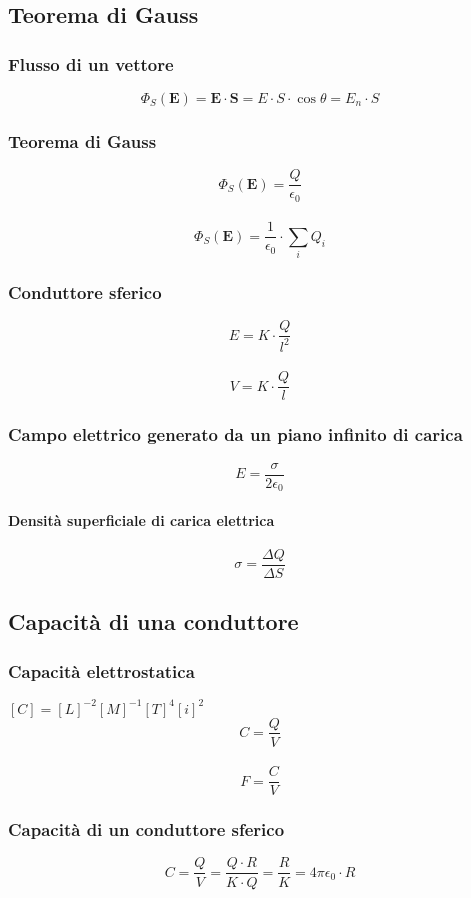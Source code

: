 \documentclass[a4paper,12pt]{article}
\theoremstyle{mystyle}
\begin{document}
\newpage


\subsection{Teorema di Gauss}
\subsubsection{Flusso di un vettore}
\[\Phi_S (\textbf{E}) = \textbf{E} \cdot \textbf{S} = E \cdot S \cdot \cos \theta = E_n \cdot S\]
\subsubsection{Teorema di Gauss}
\[\Phi_S (\textbf{E}) = \frac{Q}{\epsilon _0}\]\\
\[\Phi _S (\textbf{E}) = \frac{1}{\epsilon_0} \cdot \sum_i Q_i\]
\subsubsection{Conduttore sferico}
\[E = K \cdot \frac{Q}{l^2}\]\\
\[V = K \cdot \frac{Q}{l}\]
\subsubsection{Campo elettrico generato da un piano infinito di carica}
\[E = \frac{\sigma}{2 \epsilon_0}\]
\paragraph{Densità superficiale di carica elettrica}
\[\sigma = \frac{\Delta Q}{\Delta S}\]

\newpage

 
\subsection{Capacità di una conduttore}
\subsubsection{Capacità elettrostatica}
\([C]=[L]^{-2}[M]^{-1}[T]^4[i]^2\)\\
\[C = \frac{Q}{V}\]\\
\[F= \frac{C}{V}\]
\subsubsection{Capacità di un conduttore sferico}
\[C = \frac{Q}{V} = \frac{Q \cdot R}{K \cdot Q} = \frac{R}{K} = 4 \pi \epsilon_0 \cdot R\]
\end{document}
